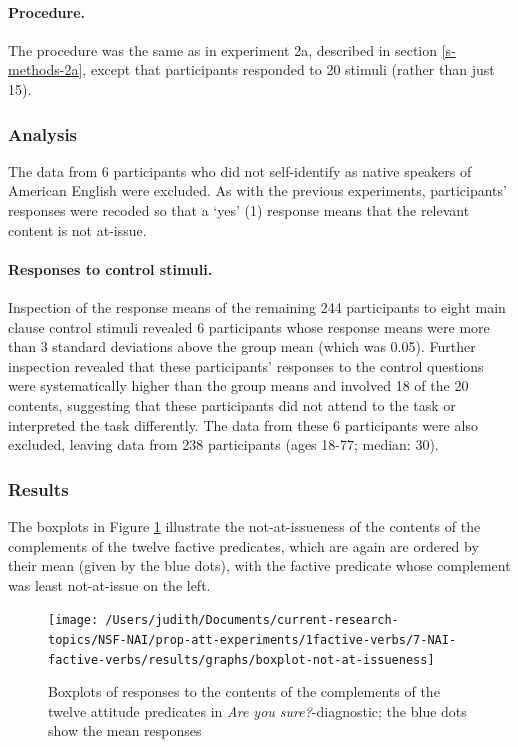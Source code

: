 \documentclass[11pt,fleqn]{article}
\newcommand{\6}{\mbox{$[\hspace*{-.6mm}[$}}
\newcommand{\9}{\mbox{$]\hspace*{-.6mm}]$}}
\begin{document}
\paragraph{Procedure.} The procedure was the same as in experiment 2a, described in section \ref{s-methods-2a}, except that participants responded to 20 stimuli (rather than just 15).

\subsubsection{Analysis}

The data from 6 participants who did not self-identify as native speakers of American English were excluded. As with the previous experiments, participants' responses were recoded so that a `yes' (1) response means that the relevant content is not at-issue.

\paragraph{Responses to control stimuli.} 
Inspection of the response means of the remaining 244 participants to eight main clause control stimuli revealed 6 participants whose response means were more than 3 standard deviations above the group mean (which was 0.05). Further inspection revealed that these participants' responses to the control questions were systematically higher than the group means and involved 18 of the 20 contents, suggesting that these participants did not attend to the task or interpreted the task differently. The data from these 6 participants were also excluded, leaving data from 238 participants (ages 18-77; median: 30). 

\subsubsection{Results}

The boxplots in Figure \ref{f-exp2b} illustrate the not-at-issueness of the contents of the complements of the twelve factive predicates, which are again are ordered by their mean (given by the blue dots), with the factive predicate whose complement was least not-at-issue on the left.

\begin{figure}[!h]

\begin{center}

\texttt{[image: /Users/judith/Documents/current-research-topics/NSF-NAI/prop-att-experiments/1factive-verbs/7-NAI-factive-verbs/results/graphs/boxplot-not-at-issueness]}
\end{center}

\caption{Boxplots of responses to the contents of the complements of the twelve attitude predicates in {\em Are you sure?}-diagnostic; the blue dots show the mean responses}\label{f-exp2b}
\end{figure}
\end{document}
